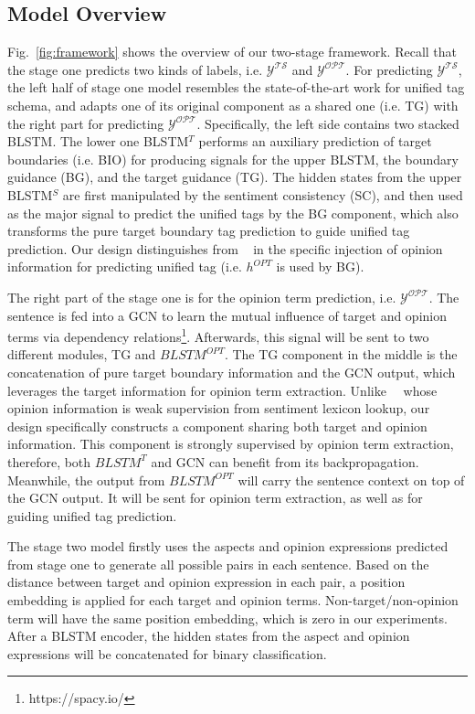 \documentclass[letterpaper]{article} \usepackage{aaai20}  \usepackage{times}  \usepackage{helvet} \usepackage{courier}  \usepackage[hyphens]{url}  \usepackage{graphicx} \urlstyle{rm} \def\UrlFont{\rm}  \usepackage{graphicx}  \frenchspacing  \setlength{\pdfpagewidth}{8.5in}  \setlength{\pdfpageheight}{11in}
\newcommand{\citet}[1]
{\citeauthor{#1}~\shortcite{#1}}
\begin{document}
\subsection{Model Overview}
Fig.~\ref{fig:framework} shows the overview of our two-stage framework. 
Recall that the stage one predicts two kinds of labels, i.e. $\mathcal{Y}^{\mathcal{TS}}$ and $\mathcal{Y}^{\mathcal{OPT}}$. 
For predicting $\mathcal{Y}^{\mathcal{TS}}$, the left half of stage one model resembles the state-of-the-art work \cite{li2019unified} for unified tag schema,
and adapts one of its original component as a shared one (i.e. TG) with the right part for predicting $\mathcal{Y}^{\mathcal{OPT}}$. 
Specifically, the left side contains two stacked BLSTM. The lower one BLSTM$^T$ performs an auxiliary prediction of target boundaries (i.e. BIO) for producing signals for the upper BLSTM, the boundary guidance (BG), and the target guidance (TG). The hidden states from the upper BLSTM$^S$ are first manipulated by the sentiment consistency (SC), and then used as the major signal to predict the unified tags by the BG component, which also transforms the pure target boundary tag prediction to guide unified tag prediction. Our design distinguishes from \citet{li2019unified} in the specific injection of opinion information for predicting unified tag (i.e. $h^{OPT}$ is used by BG).



The right part of the stage one is for the opinion term prediction, i.e. $\mathcal{Y}^{\mathcal{OPT}}$. The sentence is fed into a GCN to learn the mutual influence of target and opinion terms via dependency relations\footnote{https://spacy.io/}.
Afterwards, this signal will be sent to two different modules, TG and $BLSTM^{OPT}$. The TG component in the middle is the concatenation of pure target boundary information and the GCN output, which leverages the target information for opinion term extraction. Unlike~\citet{li2019unified} whose opinion information is weak supervision from sentiment lexicon lookup, our design specifically constructs a component sharing both target and opinion information. This component is strongly supervised by opinion term extraction, therefore, both $BLSTM^{T}$ and GCN can benefit from its backpropagation. Meanwhile, the output from $BLSTM^{OPT}$ will carry the sentence context on top of the GCN output. It will be sent for opinion term extraction, as well as for guiding unified tag prediction.



The stage two model firstly uses the aspects and opinion expressions predicted from stage one to generate all possible pairs in each sentence. Based on the distance between target and opinion expression in each pair, a position embedding is applied for each target and opinion terms. Non-target/non-opinion term will have the same position embedding, which is zero in our experiments. After a BLSTM encoder, the hidden states from the aspect and opinion expressions will be concatenated for binary classification.
\end{document}

